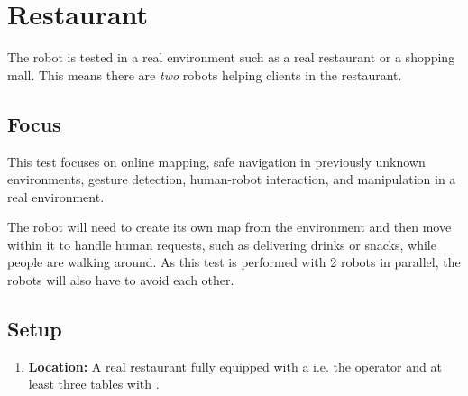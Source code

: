 \section{Restaurant}
The robot is tested in a real environment such as a real restaurant or a shopping mall.
This means there are \emph{two} robots helping clients in the restaurant. 

\subsection{Focus}
This test focuses on online mapping, safe navigation in previously unknown environments, gesture detection, human-robot interaction, and manipulation in a real environment.

The robot will need to create its own map from the environment and then move within it to handle human requests, such as delivering drinks or snacks, while people are walking around.
As this test is performed with 2 robots in parallel, the robots will also have to avoid each other. 

\subsection{Setup}
\begin{enumerate}
	\item \textbf{Location:} A real restaurant fully equipped with a  i.e. the operator and at least three tables with . 
\end{enumerate}

